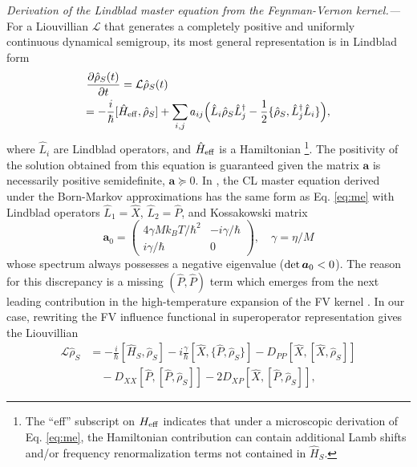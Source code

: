 \documentclass[prl,twocolumn,superscriptaddress,amsmath,amssymb]{revtex4-2}
\def\be{\begin{equation}}
\def\ee{\end{equation}}
\newcommand{\hb}{\hbar}
\begin{document}
{\it Derivation of the Lindblad master equation from the Feynman-Vernon kernel.---}For a Liouvillian $\mathcal{L}$ that generates a completely positive and uniformly continuous dynamical semigroup, its most general representation is in Lindblad form \cite{Gorini1976, Lindblad1976}
\begin{align}\label{eq:me} 
&\frac{\partial\hat{\rho}_S(t)}{\partial t} = \mathcal{L}\hat{\rho}_S(t) \nonumber\\ 
&\hspace{-.11cm}= -\frac{i}{\hb}[\hat{H}_{\rm eff},\hat{\rho}_S]+ \sum_{i,j} a_{ij}
\Big(\hat{L}_i\hat{\rho}_S\hat{L}_j^{\dagger}
-\frac{1}{2}\{\hat{\rho}_S,
\hat{L}_j^{\dagger} \hat{L}_i\}\Big),
\end{align}
where $\hat{L}_i$ are Lindblad operators, and $\hat{H}_{\rm eff}$ is a Hamiltonian \footnote{The ``eff'' subscript on $H_{\rm eff}$ indicates that under a microscopic derivation of Eq. \eqref{eq:me}, the Hamiltonian contribution can contain additional Lamb shifts and/or frequency renormalization terms not contained in $\hat{H}_S$.}. The positivity of the solution obtained from this equation is guaranteed given the matrix $\boldsymbol{a}$ is necessarily positive semidefinite, $\boldsymbol{a}\succeq 0$. In \cite{BP2002, CaldeiraLeggettA}, the CL master equation derived under the Born-Markov approximations has the same form as Eq. \eqref{eq:me} with Lindblad operators $\hat{L}_1=\hat{X}$, $\hat{L}_2=\hat{P}$, and Kossakowski matrix 
\be\label{eq:a0}
\boldsymbol{a}_0=
\begin{pmatrix}
  4\gamma Mk_BT/\hb^2 & -i\gamma/\hb \\
  i\gamma/\hb & 0
\end{pmatrix}, \quad \gamma=\eta/M
\ee
whose spectrum always possesses a negative eigenvalue (${\rm det}\,\boldsymbol{a}_0<0$). The reason for this discrepancy is a missing $(\hat{P},\hat{P})$ term which emerges from the next leading contribution in the high-temperature expansion of the FV kernel \cite{BP2002,Diosi1993,Diosi1993a,Gao1997,Ford1999,Vacchini2000}. In our case, rewriting the FV influence functional in superoperator representation \cite{Aurell2020} gives the Liouvillian 
\begin{align}\label{eq:liouville}
	\mathcal{L}\hat{\rho}_S &= -\frac{i}{\hb}[\hat{H}_S,\hat{\rho}_S] - i\frac{\gamma}{\hb}[\hat{X},\{\hat{P},\hat{\rho}_S\}] - D_{PP}[\hat{X},[\hat{X},\hat{\rho}_S]] \nonumber\\
					    &\quad - D_{XX}[\hat{P},[\hat{P},\hat{\rho}_S]] - 2D_{XP}[\hat{X},[\hat{P},\hat{\rho}_S]],
\end{align}
\end{document}
